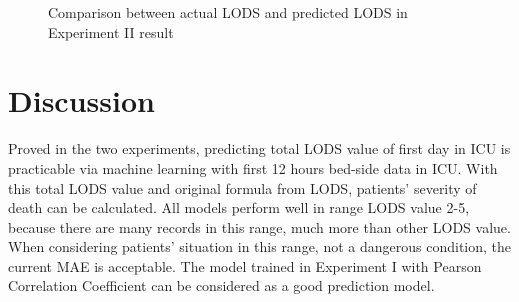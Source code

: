 \documentclass[12pt,a4paper,english
]{tunithesis}
\begin{document}
\begin{figure}
  \begin{center}
    \qquad                        
    \caption[Actual value \& Predicted value]{Comparison between actual LODS and predicted LODS in Experiment II result}

    \label{fig:experiment_2_result}
  \end{center}
\end{figure}

\chapter{Discussion}
\label{ch:discussion}

Proved in the two experiments, predicting total LODS value of first day in ICU is practicable via machine learning with first 12 hours bed-side data in ICU. With this total LODS value and original formula from LODS, patients' severity of death can be calculated. All models perform well in range LODS value 2-5, because there are many records in this range, much more than other LODS value. When considering patients' situation in this range, not a dangerous condition, the current MAE is acceptable. The model trained in Experiment I with Pearson Correlation Coefficient can be considered as a good prediction model.
\end{document}
